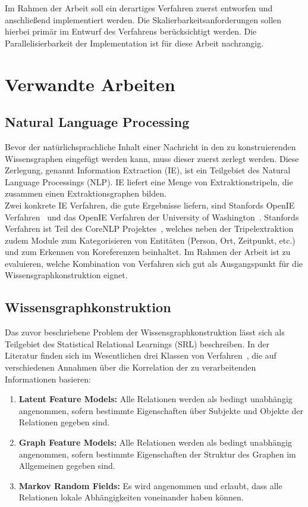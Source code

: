 \documentclass[11pt, a4paper]{scrreprt}
\begin{document}
Im Rahmen der Arbeit soll ein derartiges Verfahren zuerst entworfen und anschließend implementiert werden.
Die Skalierbarkeitsanforderungen sollen hierbei primär im Entwurf des Verfahrens berücksichtigt werden.
Die Parallelisierbarkeit der Implementation ist für diese Arbeit nachrangig.

\section{Verwandte Arbeiten}

\subsection{Natural Language Processing}

Bevor der natürlichsprachliche Inhalt einer Nachricht in den zu konstruierenden Wissensgraphen eingefügt werden kann, muss dieser zuerst zerlegt werden.
Diese Zerlegung, genannt Information Extraction (IE), ist ein Teilgebiet des Natural Language Processings (NLP).
IE liefert eine Menge von Extraktionstripeln, die zusammen einen Extraktionsgraphen bilden.\\

Zwei konkrete IE Verfahren, die gute Ergebnisse liefern, sind Stanfords OpenIE Verfahren~\cite{angeli:2015} und das OpenIE Verfahren der University of Washington~\cite{uw:online}.
Stanfords Verfahren ist Teil des CoreNLP Projektes~\cite{manning:2014}, welches neben der Tripelextraktion zudem Module zum Kategorisieren von Entitäten (Person, Ort, Zeitpunkt, etc.) und zum Erkennen von Koreferenzen beinhaltet.
Im Rahmen der Arbeit ist zu evaluieren, welche Kombination von Verfahren sich gut als Ausgangspunkt für die Wissensgraphkonstruktion eignet.

\subsection{Wissensgraphkonstruktion}

Das zuvor beschriebene Problem der Wissensgraphkonstruktion lässt sich als Teilgebiet des Statistical Relational Learnings (SRL) beschreiben. In der Literatur finden sich im Wesentlichen drei Klassen von Verfahren~\cite{nickel:2016}, die auf verschiedenen Annahmen über die Korrelation der zu verarbeitenden Informationen basieren:
\begin{enumerate}
	\item \textbf{Latent Feature Models:}
		Alle Relationen werden als bedingt unabhängig angenommen, sofern bestimmte Eigenschaften über Subjekte und Objekte der Relationen gegeben sind.
	\item \textbf{Graph Feature Models:}
		Alle Relationen werden als bedingt unabhängig angenommen, sofern bestimmte Eigenschaften der Struktur des Graphen im Allgemeinen gegeben sind.
	\item \textbf{Markov Random Fields:}
		Es wird angenommen und erlaubt, dass alle Relationen lokale Abhängigkeiten voneinander haben können.
\end{enumerate}
\end{document}
